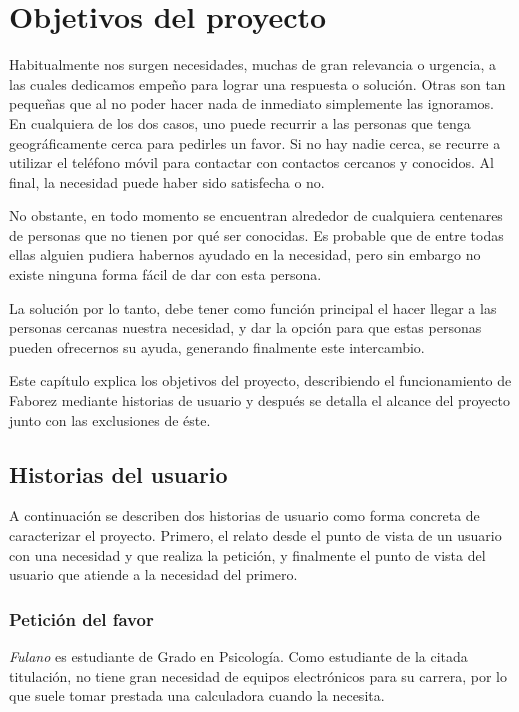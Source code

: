 \documentclass[main]{subfiles}
\begin{document}
\chapter{Objetivos del proyecto}
\label{sec:objetivos}

Habitualmente nos surgen necesidades, muchas de gran relevancia o urgencia, a las cuales dedicamos empeño para lograr una respuesta o solución. Otras son tan pequeñas que al no poder hacer nada de inmediato simplemente las ignoramos. En cualquiera de los dos casos, uno puede recurrir a las personas que tenga geográficamente cerca para pedirles un favor. Si no hay nadie cerca, se recurre a utilizar el teléfono móvil para contactar con contactos cercanos y conocidos. Al final, la necesidad puede haber sido satisfecha o no.

No obstante, en todo momento se encuentran alrededor de cualquiera centenares de personas que no tienen por qué ser conocidas. Es probable que de entre todas ellas alguien pudiera habernos ayudado en la necesidad, pero sin embargo no existe ninguna forma fácil de dar con esta persona.

La solución por lo tanto, debe tener como función principal el hacer llegar a las personas cercanas nuestra necesidad, y dar la opción para que estas personas pueden ofrecernos su ayuda, generando finalmente este intercambio.

Este capítulo explica los objetivos del proyecto, describiendo el funcionamiento de Faborez mediante historias de usuario y después se detalla el alcance del proyecto junto con las exclusiones de éste.


\section{Historias del usuario}
\label{sec:antecedentes-problema}

A continuación se describen dos historias de usuario como forma concreta de caracterizar el proyecto. Primero, el relato desde el punto de vista de un usuario con una necesidad y que realiza la petición, y finalmente el punto de vista del usuario que atiende a la necesidad del primero.

\subsection{Petición del favor}

\emph{Fulano} es estudiante de Grado en Psicología. Como estudiante de la citada titulación, no tiene gran necesidad de equipos electrónicos para su carrera, por lo que suele tomar prestada una calculadora cuando la necesita.
\end{document}
